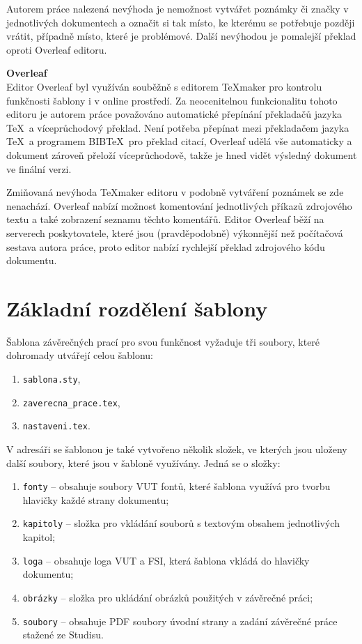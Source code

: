 Autorem práce nalezená nevýhoda je nemožnost vytvářet poznámky či značky v jednotlivých dokumentech a označit si tak místo, ke kterému se potřebuje později vrátit, případně místo, které je problémové. Další nevýhodou je pomalejší překlad oproti Overleaf editoru.

\vspace{8pt}
\textbf{Overleaf}\\
Editor Overleaf byl využíván souběžně s editorem \TeX maker pro kontrolu funkčnosti šablony i v online prostředí. Za neocenitelnou funkcionalitu tohoto editoru je autorem práce považováno automatické přepínání překladačů jazyka \TeX\ a víceprůchodový překlad. Není potřeba přepínat mezi překladačem jazyka \TeX\ a programem BIB\TeX\ pro překlad citací, Overleaf udělá vše automaticky a dokument zároveň přeloží víceprůchodově, takže je hned vidět výsledný dokument ve finální verzi.

Zmiňovaná nevýhoda \TeX maker editoru v podobně vytváření poznámek se zde nenachází. Overleaf nabízí možnost komentování jednotlivých příkazů zdrojového textu a také zobrazení seznamu těchto komentářů. Editor Overleaf běží na serverech poskytovatele, které jsou (pravděpodobně) výkonnější než počítačová sestava autora práce, proto editor nabízí rychlejší překlad zdrojového kódu dokumentu.



\section{Základní rozdělení šablony}
Šablona závěrečných prací pro svou funkčnost vyžaduje tři soubory, které dohromady utvářejí celou šablonu:

\begin{enumerate}
	\item \verb|sablona.sty|,
	\item \verb|zaverecna_prace.tex|,
	\item \verb|nastaveni.tex|.
\end{enumerate}

V adresáři se šablonou je také vytvořeno několik složek, ve kterých jsou uloženy další soubory, které jsou v šabloně využívány. Jedná se o složky:

\begin{enumerate}
	\item \verb|fonty| -- obsahuje soubory VUT fontů, které šablona využívá pro tvorbu hlavičky každé strany dokumentu;
	\item \verb|kapitoly| -- složka pro vkládání souborů s textovým obsahem jednotlivých kapitol;
	\item \verb|loga| -- obsahuje loga VUT a FSI, která šablona vkládá do hlavičky dokumentu;
	\item \verb|obrázky| -- složka pro ukládání obrázků použitých v závěrečné práci;
	\item \verb|soubory| -- obsahuje PDF soubory úvodní strany a zadání závěrečné práce stažené ze Studisu.
\end{enumerate}

